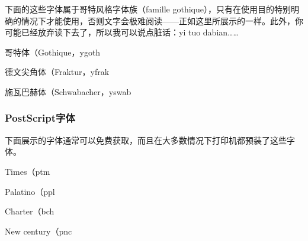 {\selectfont 下面的这些字体属于哥特风格字体族（famille gothique），只有在使用目的特别明确的情况下才能使用，否则文字会极难阅读——正如这里所展示的一样。此外，你可能已经放弃读下去了，所以我可以说点脏话：yi tuo dabian……\\
}

\begin{decritfonte}[U]{哥特体（Gothique，}{ygoth}
\end{decritfonte}
\begin{decritfonte}[U]{德文尖角体（Fraktur，}{yfrak}
\end{decritfonte}
\begin{decritfonte}[U]{施瓦巴赫体（Schwabacher，}{yswab}
\end{decritfonte}

\subsubsection{PostScript字体}

下面展示的字体通常可以免费获取，而且在大多数情况下打印机都预装了这些字体。

\begin{decritfonte}{Times（}{ptm}
  \end{decritfonte}
  
  \begin{decritfonte}{Palatino（}{ppl}
  \end{decritfonte}
  
  \begin{decritfonte}{Charter（}{bch}
  \end{decritfonte}
  
  \begin{decritfonte}{New century（}{pnc}
  \end{decritfonte}
  
